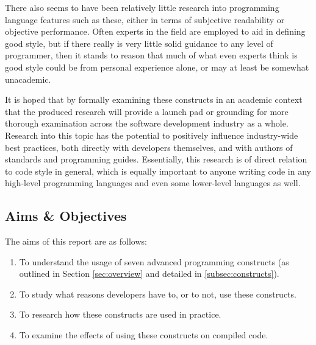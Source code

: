 \documentclass{article}
\begin{document}
        There also seems to have been relatively little research into programming language features such as these, either in terms of subjective readability or objective performance. Often experts in the field are employed to aid in defining good style, but if there really is very little solid guidance to any level of programmer, then it stands to reason that much of what even experts think is good style could be from personal experience alone, or may at least be somewhat unacademic.
        
        It is hoped that by formally examining these constructs in an academic context that the produced research will provide a launch pad or grounding for more thorough examination across the software development industry as a whole. Research into this topic has the potential to positively influence industry-wide best practices, both directly with developers themselves, and with authors of standards and programming guides. Essentially, this research is of direct relation to code style in general, which is equally important to anyone writing code in any high-level programming languages and even some lower-level languages as well.

    \subsection{Aims \& Objectives}
    \label{subsec:aimsAndObjs}
        The aims of this report are as follows:
        \begin{enumerate}
            \item To understand the usage of seven advanced programming constructs (as outlined in Section \ref{sec:overview} and detailed in \ref{subsec:constructs}).
            \item To study what reasons developers have to, or to not, use these constructs.
            \item To research how these constructs are used in practice.
            \item To examine the effects of using these constructs on compiled code.
        \end{enumerate}
        \hspace*{1cm}\newline
\end{document}
